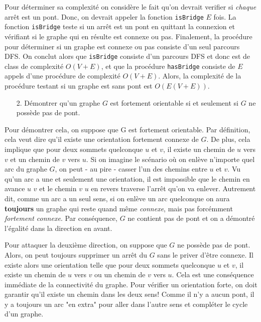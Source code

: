 \documentclass[10pt]{article} %
\begin{document}
Pour déterminer sa complexité on considère le fait qu'on devrait verifier si \textit{chaque} arrêt est un pont. Donc, on devrait appeler la fonction
\texttt{isBridge} $E$ fois. La fonction \texttt{isBridge} teste si un arrêt est un pont en quittant la connexion et vérifiant si le graphe qui en résulte est connexe
ou pas. Finalement, la procédure pour déterminer si un graphe est connexe ou pas consiste d'un seul parcours DFS. On conclut alors que \texttt{isBridge} consiste d'un parcours
DFS et donc est de class de complexité $O(V + E)$, et que la procédure \texttt{hasBridge} consiste de $E$ appels d'une procédure de complexité $O(V + E)$. Alors, la complexité
de la procédure testant si un graphe est sans pont est $O(E(V + E))$.

\begin{itemize}
    \item [2.] Démontrer qu'un graphe $G$ est fortement orientable si et seulement si $G$ ne possède pas de pont.
\end{itemize}

Pour démontrer cela, on suppose que G est fortement orientable. Par définition, cela veut dire qu'il existe une orientation fortement connexe de $G$. De plus, cela implique
que pour deux sommets quelconque $u$ et $v$, il existe un chemin de $u$ vers $v$ et un chemin de $v$ vers $u$. Si on imagine le scénario où on enlève
n'importe quel arc du graphe $G$, on peut - au pire - casser l'un des chemins entre $u$ et $v$. Vu qu'un arc a une et seulement une orientation, il est impossible que le chemin en avance
$u$  $v$ et le chemin $v$  $u$ en revers traverse l'arrêt qu'on va enlever. Autrement dit, comme un arc a un seul sens, si on enlève un arc quelconque on aura \textbf{toujours} un graphe
qui reste quand même \textit{connexe}, mais pas forcémment \textit{fortement connexe}. Par conséquence, $G$ ne contient pas de pont et on a démontré l'égalité dans la direction en avant.

Pour attaquer la deuxième direction, on suppose que $G$ ne possède pas de pont. Alors, on peut toujours supprimer un arrêt du $G$ sans le priver d'être connexe. Il existe alors une orientation telle que
pour deux sommets quelconque $u$ et $v$, il existe un chemin de $u$ vers $v$ ou un chemin de $v$ vers $u$. Cela est une conséquence immédiate de la connectivité du graphe. Pour vérifier un orientation forte, on
doit garantir qu'il existe un chemin dans les deux sens! Comme il n'y a aucun pont, il y a toujours un arc "en extra" pour aller dans l'autre sens et compléter le cycle d'un graphe.
\end{document}
